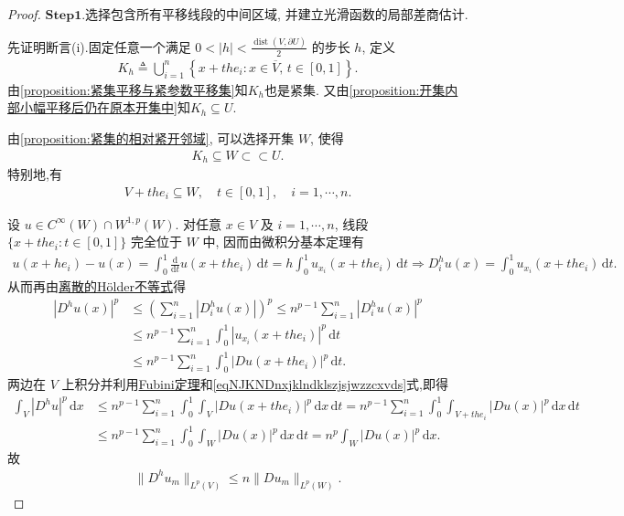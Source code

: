 \documentclass[../../main.tex]{subfiles}
\begin{document}
\begin{proof}
\noindent$\mathbf{Step}\bm{1}$.{\heiti 选择包含所有平移线段的中间区域, 并建立光滑函数的局部差商估计.}

先证明断言(i).固定任意一个满足 $0<|h|<\frac{\operatorname{dist}(V,\partial U)}{2}$ 的步长 $h$, 定义
\begin{align*}
K_h\triangleq
\bigcup\limits_{i=1}^n
\left\{
x+the_i:
x\in\overline{V},\, t\in[0,1]
\right\}.
\end{align*}
由\cref{proposition:紧集平移与紧参数平移集}知$K_h$也是紧集.
又由\cref{proposition:开集内部小幅平移后仍在原本开集中}知$K_h\subseteq U$.

由\cref{proposition:紧集的相对紧开邻域}, 可以选择开集 $W$, 使得
\begin{align*}
K_h\subseteq W\subset\subset U.
\end{align*}
特别地,有
\begin{align}\label{eqNJKNDnxjklndklszjsjwzzcxvds}
V+the_i\subseteq W,
\quad t\in[0,1],\quad i=1,\cdots,n.
\end{align}

设 $u\in C^\infty(W)\cap W^{1,p}(W)$.
对任意 $x\in V$ 及 $i=1,\cdots,n$, 线段 $\{x+the_i:t\in[0,1]\}$ 完全位于 $W$ 中, 因而由微积分基本定理有
\begin{align*}
u\left( x+he_i \right) -u\left( x \right) =\int_0^1{\frac{\mathrm{d}}{\mathrm{d}t}u\left( x+the_i \right) \,\mathrm{d}t}=h\int_0^1{u_{x_i}\left( x+the_i \right) \,\mathrm{d}t}\Longrightarrow D^h_i u(x)=\int_0^1{u_{x_i}\left( x+the_i \right) \,\mathrm{d}t}.
\end{align*}
从而再由\hyperref[Basis of Analytics-theorem:离散的Hölder不等式]{离散的Hölder不等式}得
\begin{align*}
|D^h u(x)|^p
&\leqslant \left( \sum_{i=1}^n |D_i^h u(x)| \right)^p
\leqslant n^{p-1} \sum_{i=1}^n |D_i^h u(x)|^p \\
&\leqslant n^{p-1} \sum_{i=1}^n \int_0^1 |u_{x_i}(x + t h e_i)|^p \,\mathrm{d}t \\
&\leqslant n^{p-1} \sum_{i=1}^n \int_0^1 |Du(x + t h e_i)|^p \,\mathrm{d}t.
\end{align*}
两边在 $V$ 上积分并利用\hyperref[Real Analysis-theorem:实变函数-Fubini定理]{Fubini定理}和\eqref{eqNJKNDnxjklndklszjsjwzzcxvds}式,即得
\begin{align*}
\int_V{|D^hu|^p\,\mathrm{d}x}&\leqslant n^{p-1}\sum_{i=1}^n{\int_0^1{\int_V{\left| Du\left( x+the_i \right) \right|^p\,\mathrm{d}x\,\mathrm{d}t}}}=n^{p-1}\sum_{i=1}^n{\int_0^1{\int_{V+the_i}{\left| Du\left( x \right) \right|^p\,\mathrm{d}x\,\mathrm{d}t}}}
\\
&\leqslant n^{p-1}\sum_{i=1}^n{\int_0^1{\int_W{\left| Du\left( x \right) \right|^p\,\mathrm{d}x\,\mathrm{d}t}}}=n^p\int_W{\left| Du\left( x \right) \right|^p\,\mathrm{d}x}.
\end{align*}
故
\begin{align}\label{mzvjkhshtuwwaa}
\|D^h u_m\|_{L^p(V)}\leqslant n\|Du_m\|_{L^p(W)}.
\end{align}


\end{proof}
\end{document}
